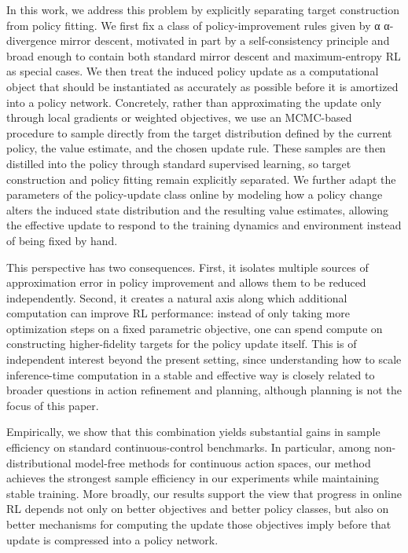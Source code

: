 \documentclass{article}
\theoremstyle{plain}
\theoremstyle{definition}
\theoremstyle{remark}
\begin{document}
In this work, we address this problem by explicitly separating target construction from policy fitting. We first fix a class of policy-improvement rules given by 
α
α-divergence mirror descent, motivated in part by a self-consistency principle and broad enough to contain both standard mirror descent and maximum-entropy RL as special cases. We then treat the induced policy update as a computational object that should be instantiated as accurately as possible before it is amortized into a policy network. Concretely, rather than approximating the update only through local gradients or weighted objectives, we use an MCMC-based procedure to sample directly from the target distribution defined by the current policy, the value estimate, and the chosen update rule. These samples are then distilled into the policy through standard supervised learning, so target construction and policy fitting remain explicitly separated. We further adapt the parameters of the policy-update class online by modeling how a policy change alters the induced state distribution and the resulting value estimates, allowing the effective update to respond to the training dynamics and environment instead of being fixed by hand.

This perspective has two consequences. First, it isolates multiple sources of approximation error in policy improvement and allows them to be reduced independently. Second, it creates a natural axis along which additional computation can improve RL performance: instead of only taking more optimization steps on a fixed parametric objective, one can spend compute on constructing higher-fidelity targets for the policy update itself. This is of independent interest beyond the present setting, since understanding how to scale inference-time computation in a stable and effective way is closely related to broader questions in action refinement and planning, although planning is not the focus of this paper.

Empirically, we show that this combination yields substantial gains in sample efficiency on standard continuous-control benchmarks. In particular, among non-distributional model-free methods for continuous action spaces, our method achieves the strongest sample efficiency in our experiments while maintaining stable training. More broadly, our results support the view that progress in online RL depends not only on better objectives and better policy classes, but also on better mechanisms for computing the update those objectives imply before that update is compressed into a policy network.
\end{document}
